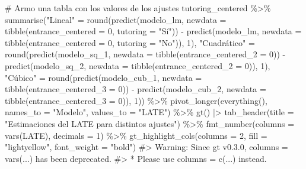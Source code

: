 \documentclass[
  letterpaper,
  DIV=11,
  numbers=noendperiod,
  oneside]{scrreprt}
\newenvironment{Shaded}{\begin{snugshade}}{\end{snugshade}}
\newcommand{\AttributeTok}[1]{\textcolor[rgb]{0.40,0.45,0.13}{#1}}
\newcommand{\CommentTok}[1]{\textcolor[rgb]{0.37,0.37,0.37}{#1}}
\newcommand{\DecValTok}[1]{\textcolor[rgb]{0.68,0.00,0.00}{#1}}
\newcommand{\FunctionTok}[1]{\textcolor[rgb]{0.28,0.35,0.67}{#1}}
\newcommand{\NormalTok}[1]{\textcolor[rgb]{0.00,0.23,0.31}{#1}}
\newcommand{\OtherTok}[1]{\textcolor[rgb]{0.00,0.23,0.31}{#1}}
\newcommand{\SpecialCharTok}[1]{\textcolor[rgb]{0.37,0.37,0.37}{#1}}
\newcommand{\StringTok}[1]{\textcolor[rgb]{0.13,0.47,0.30}{#1}}
\begin{document}
\begin{Shaded}
\begin{Highlighting}[]
\CommentTok{\# Armo una tabla con los valores de los ajustes}
\NormalTok{tutoring\_centered }\SpecialCharTok{\%\textgreater{}\%}
  \FunctionTok{summarise}\NormalTok{(}\StringTok{"Lineal"} \OtherTok{=} \FunctionTok{round}\NormalTok{(}\FunctionTok{predict}\NormalTok{(modelo\_lm, }\AttributeTok{newdata =} \FunctionTok{tibble}\NormalTok{(}\AttributeTok{entrance\_centered =} \DecValTok{0}\NormalTok{, }\AttributeTok{tutoring =} \StringTok{"Sí"}\NormalTok{)) }\SpecialCharTok{{-}} \FunctionTok{predict}\NormalTok{(modelo\_lm, }\AttributeTok{newdata =} \FunctionTok{tibble}\NormalTok{(}\AttributeTok{entrance\_centered =} \DecValTok{0}\NormalTok{, }\AttributeTok{tutoring =} \StringTok{"No"}\NormalTok{)), }\DecValTok{1}\NormalTok{),}
            \StringTok{"Cuadrático"} \OtherTok{=} \FunctionTok{round}\NormalTok{(}\FunctionTok{predict}\NormalTok{(modelo\_sq\_1, }\AttributeTok{newdata =} \FunctionTok{tibble}\NormalTok{(}\AttributeTok{entrance\_centered\_2 =} \DecValTok{0}\NormalTok{)) }\SpecialCharTok{{-}} 
                                   \FunctionTok{predict}\NormalTok{(modelo\_sq\_2, }\AttributeTok{newdata =} \FunctionTok{tibble}\NormalTok{(}\AttributeTok{entrance\_centered\_2 =} \DecValTok{0}\NormalTok{)), }\DecValTok{1}\NormalTok{),}
            \StringTok{"Cúbico"} \OtherTok{=} \FunctionTok{round}\NormalTok{(}\FunctionTok{predict}\NormalTok{(modelo\_cub\_1, }\AttributeTok{newdata =} \FunctionTok{tibble}\NormalTok{(}\AttributeTok{entrance\_centered\_3 =} \DecValTok{0}\NormalTok{)) }\SpecialCharTok{{-}} 
                               \FunctionTok{predict}\NormalTok{(modelo\_cub\_2, }\AttributeTok{newdata =} \FunctionTok{tibble}\NormalTok{(}\AttributeTok{entrance\_centered\_3 =} \DecValTok{0}\NormalTok{)), }\DecValTok{1}\NormalTok{)) }\SpecialCharTok{\%\textgreater{}\%}
  \FunctionTok{pivot\_longer}\NormalTok{(}\FunctionTok{everything}\NormalTok{(), }\AttributeTok{names\_to =} \StringTok{"Modelo"}\NormalTok{, }\AttributeTok{values\_to =} \StringTok{"LATE"}\NormalTok{) }\SpecialCharTok{\%\textgreater{}\%}
  \FunctionTok{gt}\NormalTok{() }\SpecialCharTok{|\textgreater{}}
  \FunctionTok{tab\_header}\NormalTok{(}\AttributeTok{title =} \StringTok{"Estimaciones del LATE para distintos ajustes"}\NormalTok{) }\SpecialCharTok{\%\textgreater{}\%}
  \FunctionTok{fmt\_number}\NormalTok{(}\AttributeTok{columns =} \FunctionTok{vars}\NormalTok{(LATE), }\AttributeTok{decimals =} \DecValTok{1}\NormalTok{) }\SpecialCharTok{\%\textgreater{}\%}
  \FunctionTok{gt\_highlight\_cols}\NormalTok{(}\AttributeTok{columns =} \DecValTok{2}\NormalTok{, }
                    \AttributeTok{fill =} \StringTok{"lightyellow"}\NormalTok{,}
                    \AttributeTok{font\_weight =} \StringTok{"bold"}\NormalTok{)}
\CommentTok{\#\textgreater{} Warning: Since gt v0.3.0, \textasciigrave{}columns = vars(...)\textasciigrave{} has been deprecated.}
\CommentTok{\#\textgreater{} * Please use \textasciigrave{}columns = c(...)\textasciigrave{} instead.}
\end{Highlighting}
\end{Shaded}
\end{document}
